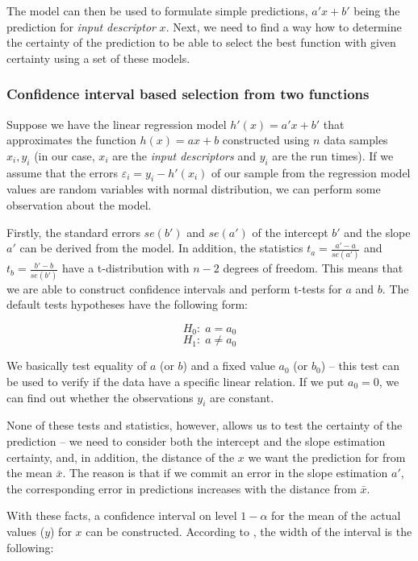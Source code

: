 The model can then be used to formulate simple predictions, $a'x + b'$ being the prediction for \textit{input descriptor} $x$. Next, we need to find a way how to determine the certainty of the prediction to be able to select the best function with given certainty using a set of these models.

\subsubsection{Confidence interval based selection from two functions}
\label{subsubsec:confidence_interval_selection}

Suppose we have the linear regression model \(h'(x) = a' x + b'\) that approximates the function $h(x) = ax + b$ constructed using \(n\) data samples \(x_i, y_i\) (in our case, \(x_i\) are the \textit{input descriptors} and \(y_i\) are the run times). If we assume that the errors $\varepsilon_i = y_i - h'(x_i)$ of our sample from the regression model values are random variables with normal distribution, we can perform some observation about the model.

Firstly, the standard errors $se(b')$ and $se(a')$ of the intercept $b'$ and the slope $a'$ can be derived from the model. In addition, the statistics $t_a = \frac{a' - a}{se(a')}$ and $t_b = \frac{b' - b}{se(b')}$ have a t-distribution with $n-2$ degrees of freedom. This means that we are able to construct confidence intervals and perform t-tests for $a$ and $b$. The default tests hypotheses have the following form:

\[H_0:\; a = a_0\]
\[H_1:\; a \neq a_0 \]

We basically test equality of $a$ (or $b$) and a fixed value $a_0$ (or $b_0$) -- this test can be used to verify if the data have a specific linear relation. If we put $a_0 = 0$, we can find out whether the observations $y_i$ are constant. 

None of these tests and statistics, however, allows us to test the certainty of the prediction -- we need to consider both the intercept and the slope estimation certainty, and, in addition, the distance of the $x$ we want the prediction for from the mean $\bar{x}$. The reason is that if we commit an error in the slope estimation $a'$, the corresponding error in predictions increases with the distance from $\bar{x}$. 

With these facts, a confidence interval on level $1 - \alpha$ for the mean of the actual values ($y$) for $x$ can be constructed. According to \cite{weiss_introductory_2010}, the width of the interval is the following:

